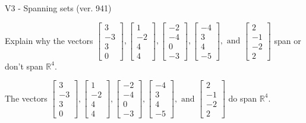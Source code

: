 \begin{exercise}
  \begin{exerciseTitle}V3 - Spanning sets (ver. 941)\end{exerciseTitle}
  \begin{exerciseStatement}
    Explain why the vectors \(\left[\begin{array}{r}
3 \\
-3 \\
3 \\
0
\end{array}\right] , \left[\begin{array}{r}
1 \\
-2 \\
4 \\
4
\end{array}\right] , \left[\begin{array}{r}
-2 \\
-4 \\
0 \\
-3
\end{array}\right] , \left[\begin{array}{r}
-4 \\
3 \\
4 \\
-5
\end{array}\right] , \text{ and } \left[\begin{array}{r}
2 \\
-1 \\
-2 \\
2
\end{array}\right]\) span or don't span \(\mathbb{R}^4\). 
	


  \end{exerciseStatement}
  \begin{exerciseAnswer}
   The vectors \(\left[\begin{array}{r}
3 \\
-3 \\
3 \\
0
\end{array}\right] , \left[\begin{array}{r}
1 \\
-2 \\
4 \\
4
\end{array}\right] , \left[\begin{array}{r}
-2 \\
-4 \\
0 \\
-3
\end{array}\right] , \left[\begin{array}{r}
-4 \\
3 \\
4 \\
-5
\end{array}\right] , \text{ and } \left[\begin{array}{r}
2 \\
-1 \\
-2 \\
2
\end{array}\right]\) 
  	 do  
	span \(\mathbb{R}^4\).
  



\end{exerciseAnswer}
\end{exercise}
